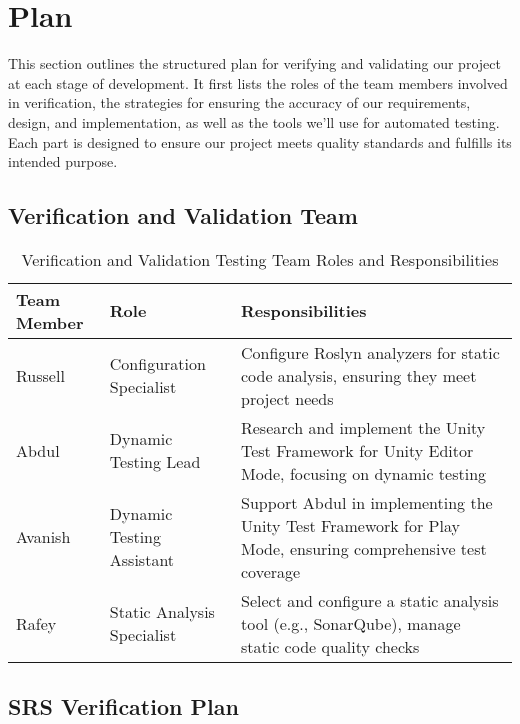 \documentclass[12pt, titlepage]{article}
\begin{document}
\newrefsection

\section{Plan}
\label{sub:plan}

This section outlines the structured plan for verifying and validating our project at each stage of development. It first lists the roles of the team members involved in verification, the strategies for ensuring the accuracy of our requirements, design, and implementation, as well as the tools we'll use for automated testing. Each part is designed to ensure our project meets quality standards and fulfills its intended purpose.

\subsection{Verification and Validation Team}

\begin{table}[h!]
\centering
\begin{tabularx}{\textwidth}{|l|l|X|}
\hline
\textbf{Team Member} & \textbf{Role} & \textbf{Responsibilities} \\ \hline
Russell & Configuration Specialist & Configure Roslyn analyzers for static code analysis, ensuring they meet project needs \\ \hline
Abdul & Dynamic Testing Lead & Research and implement the Unity Test Framework for Unity Editor Mode, focusing on dynamic testing \\ \hline
Avanish & Dynamic Testing Assistant & Support Abdul in implementing the Unity Test Framework for Play Mode, ensuring comprehensive test coverage \\ \hline
Rafey & Static Analysis Specialist & Select and configure a static analysis tool (e.g., SonarQube), manage static code quality checks \\ \hline
\end{tabularx}
\caption{Verification and Validation Testing Team Roles and Responsibilities}
\end{table}


\subsection{SRS Verification Plan}

\end{document}
